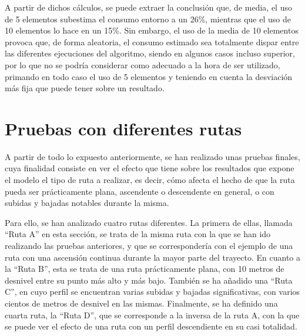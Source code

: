 \documentclass[11pt,spanish,listoffigures,listoftables]{tfgetsinf}
\begin{document}
A partir de dichos cálculos, se puede extraer la conclusión que, de media, el uso de 5 elementos subestima el consumo entorno a un 26\%, mientras que el uso de 10 elementos lo hace en un 15\%. Sin embargo, el uso de la media de 10 elementos provoca que, de forma aleatoria, el consumo estimado sea totalmente dispar entre las diferentes ejecuciones del algoritmo, siendo en algunos casos incluso superior, por lo que no se podría considerar como adecuado a la hora de ser utilizado, primando en todo caso el uso de 5 elementos y teniendo en cuenta la desviación más fija que puede tener sobre un resultado.

\newpage
\section{Pruebas con diferentes rutas}
A partir de todo lo expuesto anteriormente, se han realizado unas pruebas finales, cuya finalidad consiste en ver el efecto que tiene sobre los resultados que expone el modelo el tipo de ruta a realizar, es decir, cómo afecta el hecho de que la ruta pueda ser prácticamente plana, ascendente o descendente en general, o con subidas y bajadas notables durante la misma.

Para ello, se han analizado cuatro rutas diferentes. La primera de ellas, llamada ``Ruta A'' en esta sección, se trata de la misma ruta con la que se han ido realizando las pruebas anteriores, y que se correspondería con el ejemplo de una ruta con una ascensión continua durante la mayor parte del trayecto. En cuanto a la ``Ruta B'', esta se trata de una ruta prácticamente plana, con 10 metros de desnivel entre su punto más alto y más bajo. También se ha añadido una ``Ruta C'', en cuyo perfil se encuentran varias subidas y bajadas significativas, con varios cientos de metros de desnivel en las mismas. Finalmente, se ha definido una cuarta ruta, la ``Ruta D'', que se corresponde a la inversa de la ruta A, con la que se puede ver el efecto de una ruta con un perfil descendiente en su casi totalidad.
\end{document}
